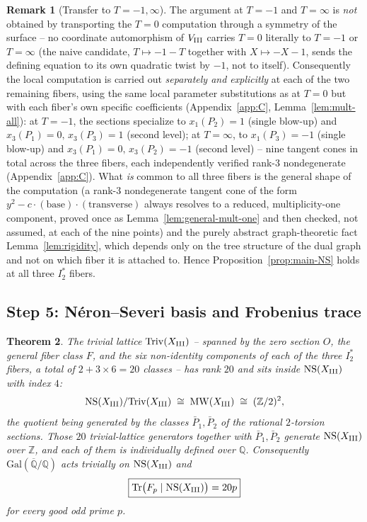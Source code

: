 \documentclass[11pt]{amsart}
\newtheorem{theorem}{Theorem}[section]
\theoremstyle{definition}
\newtheorem{remark}[theorem]{Remark}
\newcommand{\Q}{\mathbb{Q}}
\newcommand{\Z}{\mathbb{Z}}
\newcommand{\Qbar}{\overline{\mathbb{Q}}}
\newcommand{\Triv}{\mathrm{Triv}}
\newcommand{\NS}{\mathrm{NS}}
\DeclareMathOperator{\Tr}{Tr}
\begin{document}
\begin{remark}[Transfer to $T=-1,\infty$]
\label{rem:transfer}
The argument at $T=-1$ and $T=\infty$ is \emph{not} obtained by
transporting the $T=0$ computation through a symmetry of the surface --
no coordinate automorphism of $V_{\rm III}$ carries $T=0$ literally to
$T=-1$ or $T=\infty$ (the naive candidate, $T\mapsto-1-T$ together with
$X\mapsto-X-1$, sends the defining equation to its own quadratic twist by
$-1$, not to itself). Consequently the local computation is carried out
\emph{separately and explicitly} at each of the two remaining fibers,
using the same local parameter substitutions as at $T=0$ but with each
fiber's own specific coefficients (Appendix~\ref{app:C},
Lemma~\ref{lem:mult-all}): at $T=-1$, the sections specialize to
$x_1(P_2)=1$ (single blow-up) and $x_3(P_1)=0,\,x_3(P_3)=1$ (second
level); at $T=\infty$, to $x_1(P_3)=-1$ (single blow-up) and
$x_3(P_1)=0,\,x_3(P_2)=-1$ (second level) -- nine tangent cones in total
across the three fibers, each independently verified rank-$3$
nondegenerate (Appendix~\ref{app:C}). What \emph{is} common to all three
fibers is the general shape of the computation (a rank-$3$ nondegenerate
tangent cone of the form $y^2-c\cdot(\text{base})\cdot(\text{transverse})$
always resolves to a reduced, multiplicity-one component, proved once as
Lemma~\ref{lem:general-mult-one} and then checked, not assumed, at each
of the nine points) and the purely abstract graph-theoretic fact
Lemma~\ref{lem:rigidity}, which depends only on the tree structure of the
dual graph and not on which fiber it is attached to. Hence
Proposition~\ref{prop:main-NS} holds at all three $I_2^*$ fibers.
\end{remark}

\subsection*{Step 5: N\'eron--Severi basis and Frobenius trace}

\begin{theorem}
\label{thm:NS-trace}
The trivial lattice $\Triv(X_{\rm III})$ -- spanned by the zero section
$O$, the general fiber class $F$, and the six non-identity components of
each of the three $I_2^*$ fibers, a total of $2+3\times6=20$ classes --
has rank $20$ and sits inside $\NS(X_{\rm III})$ with index $4$:
\[
  \NS(X_{\rm III})/\Triv(X_{\rm III}) \;\cong\; \mathrm{MW}(X_{\rm III})
  \;\cong\; (\Z/2)^2 ,
\]
the quotient being generated by the classes $\bar P_1,\bar P_2$ of the
rational $2$-torsion sections. Those $20$ trivial-lattice generators
together with $\bar P_1,\bar P_2$ generate $\NS(X_{\rm III})$ over $\Z$,
and each of them is individually defined over $\Q$. Consequently
$\mathrm{Gal}(\Qbar/\Q)$ acts trivially on $\NS(X_{\rm III})$ and
\[
\boxed{\Tr\bigl(F_p\mid\NS(X_{\rm III})\bigr) = 20p}
\]
for every good odd prime $p$.
\end{theorem}
\end{document}
